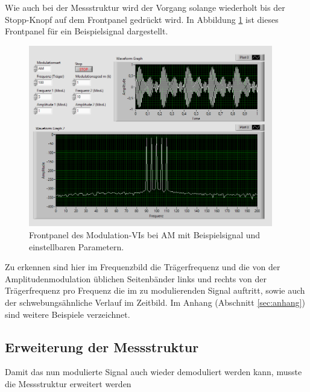 		Wie auch bei der Messstruktur wird der Vorgang solange wiederholt bis der Stopp-Knopf auf dem Frontpanel gedrückt wird.  
		In Abbildung \ref{fig:am_example} ist dieses Frontpanel für ein Beispielsignal dargestellt.
		
		\begin{figure}[H]
			\centering
			\includegraphics[width=0.95\textwidth]{pic/am_example.png}
			\caption{Frontpanel des Modulation-VIs bei AM mit Beispielsignal und einstellbaren Parametern.}
			\label{fig:am_example}	
		\end{figure} 
		
		Zu erkennen sind hier im Frequenzbild die Trägerfrequenz und die von der Amplitudenmodulation üblichen Seitenbänder links und rechts von der Trägerfrequenz pro Frequenz die im zu modulierenden Signal auftritt, sowie auch der schwebungsähnliche Verlauf im Zeitbild.
		Im Anhang (Abschnitt \ref*{sec:anhang}) sind weitere Beispiele verzeichnet.
		
	\subsection{Erweiterung der Messstruktur}
		
		Damit das nun modulierte Signal auch wieder demoduliert werden kann, musste die Messstruktur erweitert werden
